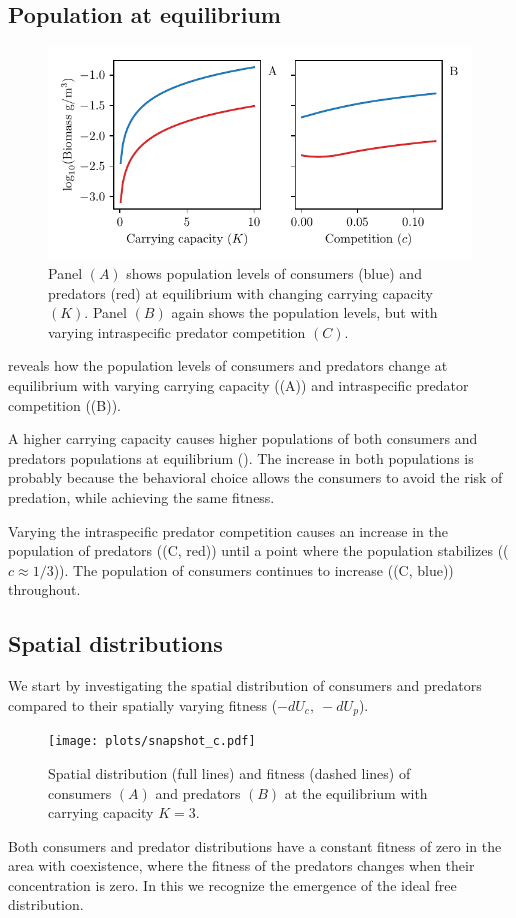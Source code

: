 \subsection{Population at equilibrium}
\begin{figure}[H]
  \caption{Panel $(A)$ shows population levels of consumers (blue) and predators (red) at equilibrium with changing carrying capacity $(K)$. Panel $(B)$ again shows the population levels, but with varying intraspecific predator competition $(C)$.}
  \label{fig:pop_levels}
  \includegraphics{plots/pop_levels_c.pdf}
\end{figure}
 reveals how the population levels of consumers and predators change at equilibrium with varying carrying capacity ((A)) and intraspecific predator competition ((B)).


A higher carrying capacity causes higher populations of both consumers and predators populations at equilibrium (). The increase in both populations is probably because the behavioral choice allows the consumers to avoid the risk of predation, while achieving the same fitness.

Varying the intraspecific predator competition causes an increase in the population of predators ((C, red)) until a point where the population stabilizes (($c\approx 1/3$)). The population of consumers continues to increase ((C, blue)) throughout.


\subsection{Spatial distributions}
We start by investigating the spatial distribution of consumers and predators compared to their spatially varying fitness ($-dU_c,~-dU_p$).
\begin{figure}[H]
  \caption{Spatial distribution (full lines) and fitness (dashed lines) of consumers $(A)$  and predators $(B)$ at the equilibrium with carrying capacity $K = 3$.}
  \label{fig:snapshot}
  \texttt{[image: plots/snapshot\_c.pdf]}
\end{figure}
Both consumers and predator distributions have a constant fitness of zero in the area with coexistence, where the fitness of the predators changes when their concentration is zero. In this we recognize the emergence of the ideal free distribution.

